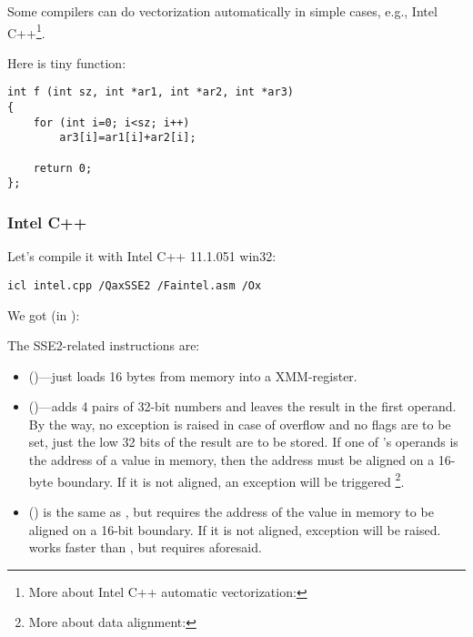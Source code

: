 
Some compilers can do vectorization automatically in simple cases, 
e.g., Intel C++\footnote{More about Intel C++ automatic vectorization: \URLINTELVEC}.

Here is tiny function:

\begin{lstlisting}
int f (int sz, int *ar1, int *ar2, int *ar3)
{
	for (int i=0; i<sz; i++)
		ar3[i]=ar1[i]+ar2[i];

	return 0;
};
\end{lstlisting}

\subsubsection{Intel C++}

Let's compile it with Intel C++ 11.1.051 win32:

\begin{verbatim}
icl intel.cpp /QaxSSE2 /Faintel.asm /Ox
\end{verbatim}

We got (in \IDA):



The SSE2-related instructions are:
\begin{itemize}
\item
\MOVDQU ()---just loads 16 bytes from memory into a XMM-register.

\item
\PADDD ()---adds 4 pairs of 32-bit numbers and leaves the result in the first operand.
By the way, no exception is raised in case of overflow and no flags are to be set, 
just the low 32 bits of the result are to be stored.
If one of \PADDD's operands is the address of a value in memory,
then the address must be aligned on a 16-byte boundary. 
If it is not aligned, an exception will be triggered
\footnote{More about data alignment: \URLWPDA}.

\item
\MOVDQA ()
is the same as \MOVDQU, but requires the address of the value in memory to be aligned on a 16-bit boundary.
If it is not aligned, exception will be raised.
\MOVDQA works faster than \MOVDQU, but requires aforesaid.

\end{itemize}

